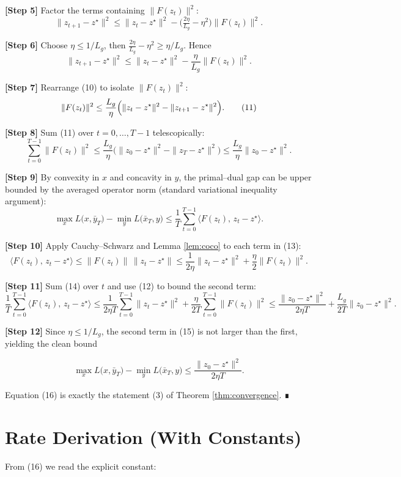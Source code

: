 \documentclass{article}
\begin{document}
\noindent\textbf{[Step 5]} Factor the terms containing $\|F(z_{t})\|^{2}$:
\[
\|z_{t+1}-z^{\star}\|^{2}
\le \|z_{t}-z^{\star}\|^{2}
-\bigl( \tfrac{2\eta}{L_{g}}-\eta^{2}\bigr)\|F(z_{t})\|^{2}.
\tag{9}
\]

\noindent\textbf{[Step 6]} Choose $\eta\le 1/L_{g}$, then $ \tfrac{2\eta}{L_{g}}-\eta^{2}\ge \eta/L_{g}$. Hence
\[
\|z_{t+1}-z^{\star}\|^{2}
\le \|z_{t}-z^{\star}\|^{2}
-\frac{\eta}{L_{g}}\|F(z_{t})\|^{2}.
\tag{10}
\]

\noindent\textbf{[Step 7]} Rearrange (10) to isolate $\|F(z_{t})\|^{2}$:
\[
\|F(z_{t})\|^{2}
\le \frac{L_{g}}{\eta}\Bigl(\|z_{t}-z^{\star}\|^{2}-\|z_{t+1}-z^{\star}\|^{2}\Bigr).
\tag{11}
\]

\noindent\textbf{[Step 8]} Sum (11) over $t=0,\dots,T-1$ telescopically:
\[
\sum_{t=0}^{T-1}\|F(z_{t})\|^{2}
\le \frac{L_{g}}{\eta}\bigl(\|z_{0}-z^{\star}\|^{2}-\|z_{T}-z^{\star}\|^{2}\bigr)
\le \frac{L_{g}}{\eta}\|z_{0}-z^{\star}\|^{2}.
\tag{12}
\]

\noindent\textbf{[Step 9]} By convexity in $x$ and concavity in $y$, the primal–dual gap can be upper bounded by the averaged operator norm (standard variational inequality argument):
\[
\max_{x}L\bigl(x,\bar{y}_{T}\bigr)-\min_{y}L\bigl(\bar{x}_{T},y\bigr)
\le \frac{1}{T}\sum_{t=0}^{T-1}\langle F(z_{t}),\,z_{t}-z^{\star}\rangle .
\tag{13}
\]

\noindent\textbf{[Step 10]} Apply Cauchy–Schwarz and Lemma \ref{lem:coco} to each term in (13):
\[
\langle F(z_{t}),\,z_{t}-z^{\star}\rangle
\le \|F(z_{t})\|\,\|z_{t}-z^{\star}\|
\le \frac{1}{2\eta}\|z_{t}-z^{\star}\|^{2}
+\frac{\eta}{2}\|F(z_{t})\|^{2}.
\tag{14}
\]

\noindent\textbf{[Step 11]} Sum (14) over $t$ and use (12) to bound the second term:
\[
\frac{1}{T}\sum_{t=0}^{T-1}\langle F(z_{t}),\,z_{t}-z^{\star}\rangle
\le \frac{1}{2\eta T}\sum_{t=0}^{T-1}\|z_{t}-z^{\star}\|^{2}
+\frac{\eta}{2T}\sum_{t=0}^{T-1}\|F(z_{t})\|^{2}
\le \frac{\|z_{0}-z^{\star}\|^{2}}{2\eta T}
+\frac{L_{g}}{2T}\|z_{0}-z^{\star}\|^{2}.
\tag{15}
\]

\noindent\textbf{[Step 12]} Since $\eta\le 1/L_{g}$, the second term in (15) is not larger than the first, yielding the clean bound  

\[
\max_{x}L\bigl(x,\bar{y}_{T}\bigr)-\min_{y}L\bigl(\bar{x}_{T},y\bigr)
\le \frac{\|z_{0}-z^{\star}\|^{2}}{2\eta T}.
\tag{16}
\]

Equation (16) is exactly the statement (3) of Theorem \ref{thm:convergence}.  ∎

\section*{Rate Derivation (With Constants)}
From (16) we read the explicit constant:  
\end{document}
